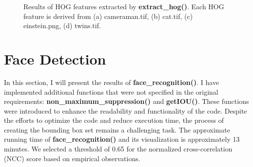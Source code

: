 \documentclass[10pt]{article}
\begin{document}
\begin{figure}[!h]
{    }
    \caption{Results of HOG features extracted by \textbf{extract\_hog()}. Each HOG feature is derived from (a) cameraman.tif, (b) cat.tif, (c) einstein.png, (d) twins.tif.}
\end{figure}

\section{Face Detection}

In this section, I will present the results of \textbf{face\_recognition()}. I have implemented additional functions that were not specified in the original requirements: \textbf{non\_maximum\_suppression()} and \textbf{getIOU()}. These functions were introduced to enhance the readability and functionality of the code. Despite the efforts to optimize the code and reduce execution time, the process of creating the bounding box set remains a challenging task. The approximate running time of \textbf{face\_recognition()} and its visualization is approximately 13 minutes. We selected a threshold of 0.65 for the normalized cross-correlation (NCC) score based on empirical observations.
\end{document}
